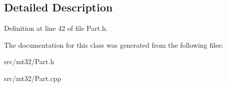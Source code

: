 \subsection{Detailed Description}


Definition at line 42 of file Part.\-h.



The documentation for this class was generated from the following files\-:\begin{DoxyCompactItemize}
\item 
src/mt32/Part.\-h\item 
src/mt32/Part.\-cpp\end{DoxyCompactItemize}
